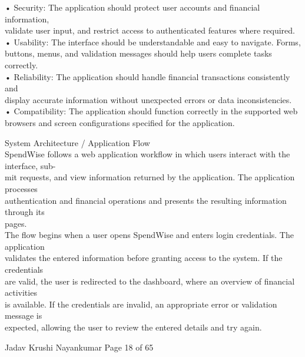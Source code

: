 \documentclass[12pt,a4paper]{report}
\begin{document}
\smallskip
• Security: The application should protect user accounts and financial information,\\ 
validate user input, and restrict access to authenticated features where required.\\ 

\smallskip
• Usability: The interface should be understandable and easy to navigate. Forms,\\ 
buttons, menus, and validation messages should help users complete tasks correctly.\\ 

\smallskip
• Reliability: The application should handle financial transactions consistently and\\ 
display accurate information without unexpected errors or data inconsistencies.\\ 

\smallskip
• Compatibility: The application should function correctly in the supported web\\ 
browsers and screen configurations specified for the application.\\ 

\smallskip

 System Architecture / Application Flow\\ 

\smallskip
SpendWise follows a web application workflow in which users interact with the interface, sub-\\ 
mit requests, and view information returned by the application. The application processes\\ 
authentication and financial operations and presents the resulting information through its\\ 
pages.\\ 
The flow begins when a user opens SpendWise and enters login credentials. The application\\ 
validates the entered information before granting access to the system. If the credentials\\ 
are valid, the user is redirected to the dashboard, where an overview of financial activities\\ 
is available. If the credentials are invalid, an appropriate error or validation message is\\ 
expected, allowing the user to review the entered details and try again.\\ 

\smallskip

\smallskip
Jadav Krushi Nayankumar                                                         Page 18 of 65\\ 
\end{document}
